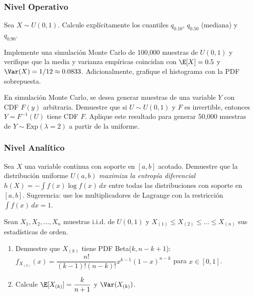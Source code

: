 \subsubsection*{Nivel Operativo}

\begin{problema}
	\label{prob:4.4.4}
	Sea $X \sim U(0, 1)$. Calcule explícitamente los cuantiles $q_{0.10}$, $q_{0.50}$ (mediana) y $q_{0.90}$.
\end{problema}

\begin{problema}
	\label{prob:4.4.5}
	Implemente una simulación Monte Carlo de 100{,}000 muestras de $U(0, 1)$ y verifique que la media y varianza empíricas coincidan con $\E[X] = 0.5$ y $\Var(X) = 1/12 \approx 0.0833$. Adicionalmente, grafique el histograma con la PDF sobrepuesta.
\end{problema}

\begin{problema}
	\label{prob:4.4.6}
	En simulación Monte Carlo, se desea generar muestras de una variable $Y$ con CDF $F(y)$ arbitraria. Demuestre que si $U \sim U(0, 1)$ y $F$ es invertible, entonces $Y = F^{-1}(U)$ tiene CDF $F$. Aplique este resultado para generar 50{,}000 muestras de $Y \sim \text{Exp}(\lambda = 2)$ a partir de la uniforme.
\end{problema}

\subsubsection*{Nivel Analítico}

\begin{problema}
	\label{prob:4.4.7}
	Sea $X$ una variable continua con soporte en $[a, b]$ acotado. Demuestre que la distribución uniforme $U(a, b)$ \emph{maximiza la entropía diferencial} $h(X) = -\int f(x) \log f(x)\,dx$ entre todas las distribuciones con soporte en $[a, b]$. Sugerencia: use los multiplicadores de Lagrange con la restricción $\int f(x)\,dx = 1$.
\end{problema}

\begin{problema}
	\label{prob:4.4.8}
	Sean $X_{1}, X_{2}, \dots, X_{n}$ muestras i.i.d. de $U(0, 1)$ y $X_{(1)} \le X_{(2)} \le \dots \le X_{(n)}$ sus estadísticas de orden.
	\begin{enumerate}
		\item Demuestre que $X_{(k)}$ tiene PDF Beta($k, n - k + 1$): $f_{X_{(k)}}(x) = \dfrac{n!}{(k-1)!(n-k)!} x^{k-1} (1-x)^{n-k}$ para $x \in [0, 1]$.
		\item Calcule $\E[X_{(k)}] = \dfrac{k}{n+1}$ y $\Var(X_{(k)})$.
	\end{enumerate}
\end{problema}

